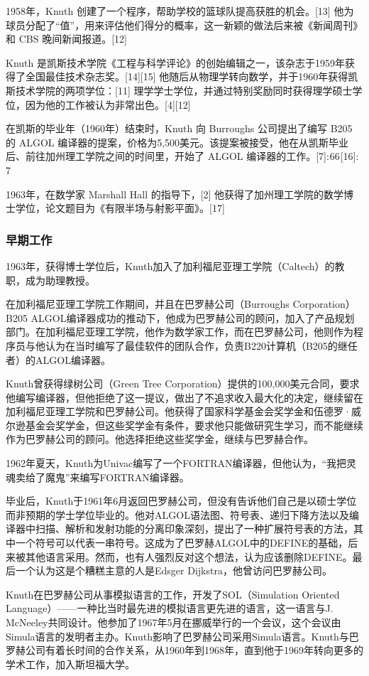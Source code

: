 1958年，Knuth 创建了一个程序，帮助学校的篮球队提高获胜的机会。[13] 他为球员分配了“值”，用来评估他们得分的概率，这一新颖的做法后来被《新闻周刊》和 CBS 晚间新闻报道。[12]  

Knuth 是凯斯技术学院《工程与科学评论》的创始编辑之一，该杂志于1959年获得了全国最佳技术杂志奖。[14][15] 他随后从物理学转向数学，并于1960年获得凯斯技术学院的两项学位：[11] 理学学士学位，并通过特别奖励同时获得理学硕士学位，因为他的工作被认为非常出色。[4][12]  

在凯斯的毕业年（1960年）结束时，Knuth 向 Burroughs 公司提出了编写 B205 的 ALGOL 编译器的提案，价格为5,500美元。该提案被接受，他在从凯斯毕业后、前往加州理工学院之间的时间里，开始了 ALGOL 编译器的工作。[7]: 66 [16]: 7  

1963年，在数学家 Marshall Hall 的指导下，[2] 他获得了加州理工学院的数学博士学位，论文题目为《有限半场与射影平面》。[17]
\subsubsection{早期工作}  
1963年，获得博士学位后，Knuth加入了加利福尼亚理工学院（Caltech）的教职，成为助理教授。

在加利福尼亚理工学院工作期间，并且在巴罗赫公司（Burroughs Corporation）B205 ALGOL编译器成功的推动下，他成为巴罗赫公司的顾问，加入了产品规划部门。在加利福尼亚理工学院，他作为数学家工作，而在巴罗赫公司，他则作为程序员与他认为在当时编写了最佳软件的团队合作，负责B220计算机（B205的继任者）的ALGOL编译器。

Knuth曾获得绿树公司（Green Tree Corporation）提供的100,000美元合同，要求他编写编译器，但他拒绝了这一提议，做出了不追求收入最大化的决定，继续留在加利福尼亚理工学院和巴罗赫公司。他获得了国家科学基金会奖学金和伍德罗·威尔逊基金会奖学金，但这些奖学金有条件，要求他只能做研究生学习，而不能继续作为巴罗赫公司的顾问。他选择拒绝这些奖学金，继续与巴罗赫合作。

1962年夏天，Knuth为Univac编写了一个FORTRAN编译器，但他认为，“我把灵魂卖给了魔鬼”来编写FORTRAN编译器。

毕业后，Knuth于1961年6月返回巴罗赫公司，但没有告诉他们自己是以硕士学位而非预期的学士学位毕业的。他对ALGOL语法图、符号表、递归下降方法以及编译器中扫描、解析和发射功能的分离印象深刻，提出了一种扩展符号表的方法，其中一个符号可以代表一串符号。这成为了巴罗赫ALGOL中的DEFINE的基础，后来被其他语言采用。然而，也有人强烈反对这个想法，认为应该删除DEFINE。最后一个认为这是个糟糕主意的人是Edsger Dijkstra，他曾访问巴罗赫公司。

Knuth在巴罗赫公司从事模拟语言的工作，开发了SOL（Simulation Oriented Language）——一种比当时最先进的模拟语言更先进的语言，这一语言与J. McNeeley共同设计。他参加了1967年5月在挪威举行的一个会议，这个会议由Simula语言的发明者主办。Knuth影响了巴罗赫公司采用Simula语言。Knuth与巴罗赫公司有着长时间的合作关系，从1960年到1968年，直到他于1969年转向更多的学术工作，加入斯坦福大学。

